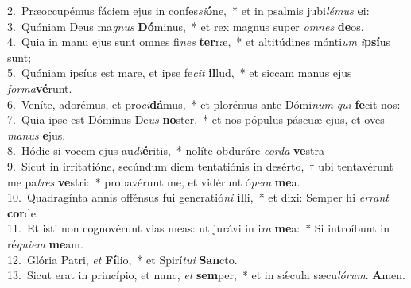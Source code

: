 {2.~}Præoccupémus fáciem ejus in confes\textit{si}\textbf{ó}ne,~* et in psalmis jubi\textit{lé}\textit{mus} \textbf{e}i:\\
{3.~}Quóniam Deus ma\textit{gnus} \textbf{Dó}minus,~* et rex magnus super \textit{om}\textit{nes} \textbf{de}os.\\
{4.~}Quia in manu ejus sunt omnes fi\textit{nes} \textbf{ter}ræ,~* et altitúdines mónti\textit{um} \textit{i}\textbf{psí}us sunt;\\
{5.~}Quóniam ipsíus est mare, et ipse fe\textit{cit} \textbf{il}lud,~* et siccam manus ejus \textit{for}\textit{ma}\textbf{vé}runt.\\
{6.~}Veníte, adorémus, et pro\textit{ci}\textbf{dá}mus,~* et plorémus ante Dómi\textit{num} \textit{qui} \textbf{fe}cit nos:\\
{7.~}Quia ipse est Dóminus De\textit{us} \textbf{no}ster,~* et nos pópulus páscuæ ejus, et oves \textit{ma}\textit{nus} \textbf{e}jus.\\
{8.~}Hódie si vocem ejus au\textit{di}\textbf{é}ritis,~* nolíte obduráre \textit{cor}\textit{da} \textbf{ve}stra\\
{9.~}Sicut in irritatióne, secúndum diem tentatiónis in desérto,~† ubi tentavérunt me pa\textit{tres} \textbf{ve}stri:~* probavérunt me, et vidérunt ó\textit{pe}\textit{ra} \textbf{me}a.\\
{10.~}Quadragínta annis offénsus fui generatió\textit{ni} \textbf{il}li,~* et dixi: Semper hi \textit{er}\textit{rant} \textbf{cor}de.\\
{11.~}Et isti non cognovérunt vias meas: ut jurávi in i\textit{ra} \textbf{me}a:~* Si introíbunt in ré\textit{qui}\textit{em} \textbf{me}am.\\
{12.~}Glória Patri, \textit{et} \textbf{Fí}lio,~* et Spirí\textit{tu}\textit{i} \textbf{San}cto.\\
{13.~}Sicut erat in princípio, et nunc, \textit{et} \textbf{sem}per,~* et in sǽcula sæcu\textit{ló}\textit{rum}. \textbf{A}men.\\
